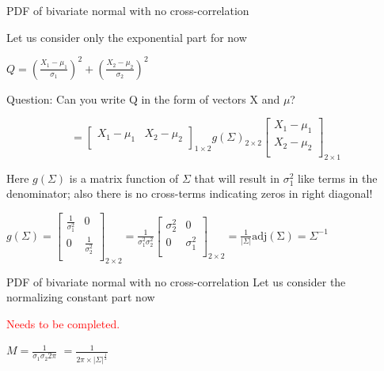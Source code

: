 \documentclass{beamer}
\begin{document}
\begin{frame}{PDF of bivariate normal with no cross-correlation}

Let us consider only the exponential part for now

$ Q =  \left(\frac{X_1-\mu_1}{\sigma_1}\right)^2 + \left(\frac{X_2-\mu_2}{\sigma_2}\right)^2 $

Question: Can you write Q in the form of vectors X and $\mu$?

$$
 = \begin{bmatrix}
	X_1 - \mu_1 &
	X_2 - \mu_2 \\
\end{bmatrix}_{1\times2}  g(\Sigma)_{2\times2} \begin{bmatrix}
X_1 - \mu_1 \\
X_2 - \mu_2 \\
\end{bmatrix}_{2\times1}
$$

Here $g(\Sigma)$ is a matrix function of $\Sigma$ that will result in $\sigma_1^2$ like terms in the denominator; also there is no cross-terms indicating zeros in right diagonal!

$g(\Sigma) = \begin{bmatrix}
 \frac{1}{\sigma_1^2}& 0  \\
 0 &  \frac{1}{\sigma_2^2} \\
\end{bmatrix}_{2\times2} = \frac{1}{\sigma_1^2 \sigma_2^2}\begin{bmatrix}
{\sigma_2^2}& 0  \\
0 &  {\sigma_1^2}   \\ 
\end{bmatrix}_{2\times2} = \frac{1}{|\Sigma|} \operatorname{adj(\Sigma)} = \Sigma^{-1}$
\end{frame}


\begin{frame}{PDF of bivariate normal with no cross-correlation}
Let us consider the normalizing constant part now

\textcolor{red}{Needs to be completed.}

$M = \frac{1}{\sigma_1 \sigma_2 2\pi }$
$=\frac{1}{2\pi \times |\Sigma|^{\frac{1}{2}}}$
\end{frame}
\end{document}
